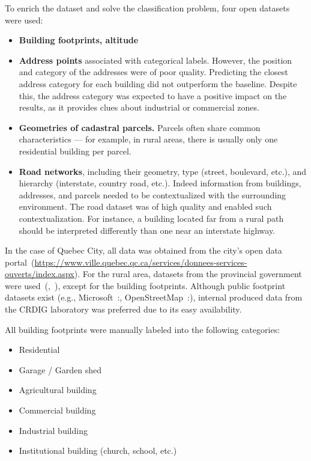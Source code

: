 \documentclass[11pt]{article}
\begin{document}
To enrich the dataset and solve the classification problem, four open datasets were used:

\begin{itemize}
    \item \textbf{Building footprints, altitude}
    
    \item \textbf{Address points} associated with categorical labels. However, the position and category of the addresses were of poor quality. Predicting the closest address category for each building did not outperform the baseline. Despite this, the address category was expected to have a positive impact on the results, as it provides clues about industrial or commercial zones.
    
    \item \textbf{Geometries of cadastral parcels.} Parcels often share common characteristics — for example, in rural areas, there is usually only one residential building per parcel.
    
    \item \textbf{Road networks}, including their geometry, type (street, boulevard, etc.), and hierarchy (interstate, country road, etc.). Indeed information from buildings, addresses, and parcels needed to be contextualized with the surrounding environment. The road dataset was of high quality and enabled such contextualization. For instance, a building located far from a rural path should be interpreted differently than one near an interstate highway.
\end{itemize}

In the case of Quebec City, all data was obtained from the city's open data portal~(\url{https://www.ville.quebec.qc.ca/services/donnees-services-ouverts/index.aspx}). For the rural area, datasets from the provincial government were used~(\cite{villedequebec2025},~\cite{opencanada_qc2025}), except for the building footprints. Although public footprint datasets exist (e.g., Microsoft~:\cite{ms2023globalmlbuildingfootprints}, OpenStreetMap~:\cite{openstreetmap_api2025}), internal produced data from the CRDIG laboratory was preferred due to its easy availability.


All building footprints were manually labeled into the following categories:

\begin{itemize}
    \item Residential
    \item Garage / Garden shed
    \item Agricultural building
    \item Commercial building
    \item Industrial building
    \item Institutional building (church, school, etc.)
\end{itemize}
\end{document}
